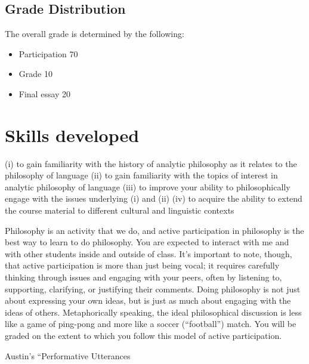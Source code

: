\documentclass{tufte-handout}
\begin{document}
\subsection{Grade Distribution}

The overall grade is determined by the following:
\begin{itemize}
\item Participation 70%
\item Grade 10%
\item Final essay 20%
\end{itemize}

\section{Skills developed}

(i) to gain familiarity with the history of analytic
philosophy as it relates to the philosophy of language (ii)
to gain familiarity with the topics of interest in analytic
philosophy of language (iii) to improve your ability to
philosophically engage with the issues underlying (i) and
(ii) (iv) to acquire the ability to extend the course
material to different cultural and linguistic contexts

Philosophy is an activity that we do, and active
participation in philosophy is the best way to learn to do
philosophy. You are expected to interact with me and with
other students inside and outside of class. It’s important
to note, though, that active participation is more than just
being vocal; it requires carefully thinking through issues
and engaging with your peers, often by listening to,
supporting, clarifying, or justifying their comments. Doing
philosophy is not just about expressing your own ideas, but
is just as much about engaging with the ideas of others.
Metaphorically speaking, the ideal philosophical discussion
is less like a game of ping-pong and more like a soccer
(“football”) match. You will be graded on the extent to
which you follow this model of active participation.

Austin’s “Performative Utterances


\end{document}
